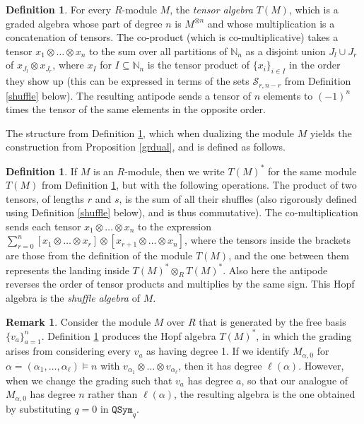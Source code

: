\documentclass{article}
\theoremstyle{definition}
\newtheorem{defn}[thm]{Definition}
\newtheorem{rmk}[thm]{Remark}
\begin{document}
\begin{defn}
For every $R$-module $M$, the \emph{tensor algebra} $T(M)$, which is a graded algebra whose part of degree $n$ is $M^{\otimes n}$ and whose multiplication is a concatenation of tensors. The co-product (which is co-multiplicative) takes a tensor $x_{1}\otimes\ldots \otimes x_{n}$ to the sum over all partitions of $\mathbb{N}_{n}$ as a disjoint union $J_{l} \cup J_{r}$ of $x_{J_{l}} \otimes x_{J_{r}}$, where $x_{I}$ for $I\subseteq\mathbb{N}_{n}$ is the tensor product of $\{x_{i}\}_{i \in I}$ in the order they show up (this can be expressed in terms of the sets $\mathcal{S}_{r,n-r}$ from Definition \ref{shuffle} below). The resulting antipode sends a tensor of $n$ elements to $(-1)^{n}$ times the tensor of the same elements in the opposite order.
\label{tensalg}
\end{defn}
The structure from Definition \ref{tensalg}, which when dualizing the module $M$ yields the construction from Proposition \ref{grdual}, and is defined as follows.
\begin{defn}
If $M$ is an $R$-module, then we write $T(M)^{*}$ for the same module $T(M)$ from Definition \ref{tensalg}, but with the following operations. The product of two tensors, of lengths $r$ and $s$, is the sum of all their shuffles (also rigorously defined using Definition \ref{shuffle} below), and is thus commutative). The co-multiplication sends each tensor $x_{1}\otimes\ldots \otimes x_{n}$ to the expression $\sum_{r=0}^{n}[x_{1}\otimes\ldots \otimes x_{r}]\otimes[x_{r+1}\otimes\ldots \otimes x_{n}]$, where the tensors inside the brackets are those from the definition of the module $T(M)$, and the one between them represents the landing inside $T(M)^{*}\otimes_{R}T(M)^{*}$. Also here the antipode reverses the order of tensor products and multiplies by the same sign. This Hopf algebra is the \emph{shuffle algebra} of $M$. \label{tensfual}
\end{defn}

\begin{rmk}
Consider the module $M$ over $R$ that is generated by the free basis $\{v_{a}\}_{a=1}^{n}$. Definition \ref{tensfual} produces the Hopf algebra $T(M)^{*}$, in which the grading arises from considering every $v_{a}$ as having degree 1. If we identify $M_{\alpha,0}$ for $\alpha=(\alpha_{1},\ldots,\alpha_{\ell}) \vDash n$ with $v_{\alpha_{1}}\otimes \ldots \otimes v_{\alpha_{\ell}}$, then it has degree $\ell(\alpha)$. However, when we change the grading such that $v_{a}$ has degree $a$, so that our analogue of $M_{\alpha,0}$ has degree $n$ rather than $\ell(\alpha)$, the resulting algebra is the one obtained by substituting $q=0$ in $\mathtt{QSym}_{q}$. \label{shdual}
\end{rmk}
\end{document}
